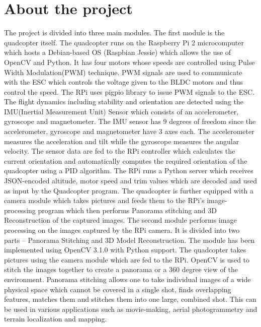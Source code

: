 \section{About the project} %
The project is divided into three main modules.  
The first module is the quadcopter itself.
The quadcopter runs on the Raspberry Pi 2 microcomputer which hosts a Debian-based OS (Raspbian Jessie) which allows the use of OpenCV and Python. 
It has four motors whose speeds are controlled using Pulse Width Modulation(PWM) technique. PWM signals are used to communicate with the ESC which controls the voltage given to the BLDC motors and thus control the speed. The RPi uses pigpio library to issue PWM signals to the ESC. 
\newline
\newline
The flight dynamics including stability and orientation are detected using the IMU(Inertial Measurement Unit) Sensor which consists of an accelerometer, gyroscope and magnetometer. The IMU sensor has 9 degrees of freedom since the accelerometer, gyroscope and magnetometer have 3 axes each. The accelerometer measures the acceleration and tilt while the gyroscope measures the angular velocity. The sensor data are fed to the RPi controller which calculates the current orientation and automatically computes the required orientation of the quadcopter using a PID algorithm. The RPi runs a Python server which receives JSON-encoded altitude, motor speed and trim values which are decoded and used as input by the Quadcopter program. The quadcopter is further equipped with a camera module which takes pictures and feeds them to the RPi's image-processing program which then performs Panorama stitching and 3D Reconstruction of the captured images.
\newline
\newline
The second module performs image processing on the images captured by the RPi camera. It is divided into two parts – Panorama Stitching and 3D Model Reconstruction. The module has been implemented using OpenCV 3.1.0 with Python support. The quadcopter takes pictures using the camera module which are fed to the RPi. OpenCV is used to stitch the images together to create a panorama or a 360 degree view of the environment. Panorama stitching allows one to take individual images of a wide physical space which cannot be covered in a single shot, finds overlapping features, matches them and stitches them into one large, combined shot. This can be used in various applications such as movie-making, aerial photogrammetry and terrain localization and mapping. 
